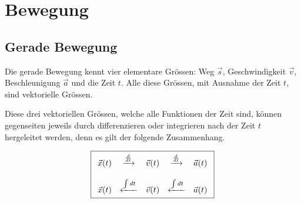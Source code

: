 



\chapter{Bewegung}

\newpage
\section{Gerade Bewegung}
Die gerade Bewegung kennt vier elementare Grössen: 
Weg $\vec{s}$, Geschwindigkeit $\vec{v}$, Beschleunigung $\vec{a}$ und
die Zeit $t$. Alle diese Grössen, mit Ausnahme der Zeit $t$, sind 
vektorielle Grössen.

Diese drei vektoriellen Grössen, welche alle Funktionen der Zeit
sind, können gegenseiten jeweils durch differenzieren oder integrieren 
nach der Zeit $t$ hergeleitet werden, denn es gilt der folgende 
Zusammenhang.

\[ \boxed{\begin{array}{c c c c c}
	\vec{x}(t) 
		& \xrightarrow{\frac{d}{dt}}
	& \vec{v}(t)
		& \xrightarrow{\frac{d}{dt}}
	& \vec{a}(t) \\
	& & & & \\
	\vec{x}(t) 
		& \xleftarrow{\int dt}
	& \vec{v}(t)
		& \xleftarrow{\int dt}
	& \vec{a}(t) \\
\end{array}} \]

